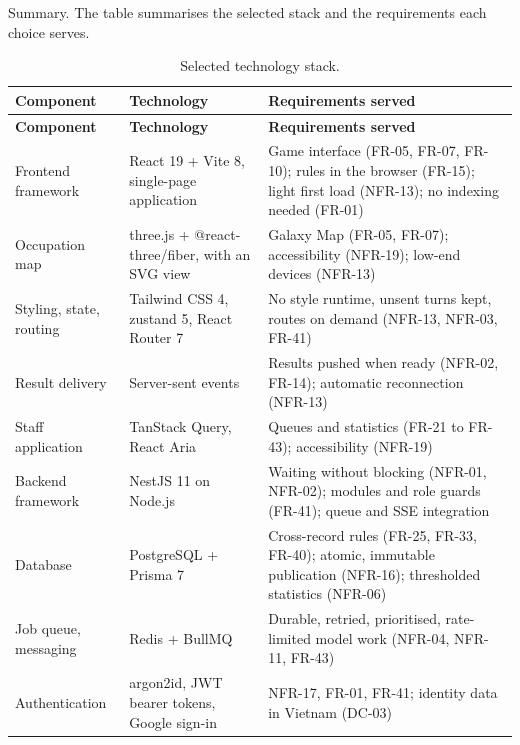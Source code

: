 Summary. The table summarises the selected stack and the requirements each choice serves.

{\small{}\renewcommand{\arraystretch}{1.1}
\begin{longtable}{|>{\raggedright\arraybackslash}p{}|>{\raggedright\arraybackslash}p{}|>{\raggedright\arraybackslash}p{}|}
\caption{Selected technology stack.} \\
\hline
\textbf{Component} & \textbf{Technology} & \textbf{Requirements served} \\ \hline
\endfirsthead
\hline
\textbf{Component} & \textbf{Technology} & \textbf{Requirements served} \\ \hline
\endhead
Frontend framework & React 19 + Vite 8, single-page application & Game interface (FR-05, FR-07, FR-10); rules in the browser (FR-15); light first load (NFR-13); no indexing needed (FR-01) \\ \hline
Occupation map & three.js + @\allowbreak{}react-\allowbreak{}three/\allowbreak{}fiber, with an SVG view & Galaxy Map (FR-05, FR-07); accessibility (NFR-19); low-end devices (NFR-13) \\ \hline
Styling, state, routing & Tailwind CSS 4, zustand 5, React Router 7 & No style runtime, unsent turns kept, routes on demand (NFR-13, NFR-03, FR-41) \\ \hline
Result delivery & Server-sent events & Results pushed when ready (NFR-02, FR-14); automatic reconnection (NFR-13) \\ \hline
Staff application & TanStack Query, React Aria & Queues and statistics (FR-21 to FR-43); accessibility (NFR-19) \\ \hline
Backend framework & NestJS 11 on Node.js & Waiting without blocking (NFR-01, NFR-02); modules and role guards (FR-41); queue and SSE integration \\ \hline
Database & PostgreSQL + Prisma 7 & Cross-\allowbreak{}record rules (FR-25, FR-33, FR-40); atomic, immutable publication (NFR-16); thresholded statistics (NFR-06) \\ \hline
Job queue, messaging & Redis + BullMQ & Durable, retried, prioritised, rate-\allowbreak{}limited model work (NFR-04, NFR-11, FR-43) \\ \hline
Authentication & argon2id, JWT bearer tokens, Google sign-in & NFR-17, FR-01, FR-41; identity data in Vietnam (DC-03) \\ \hline

\end{longtable}}
